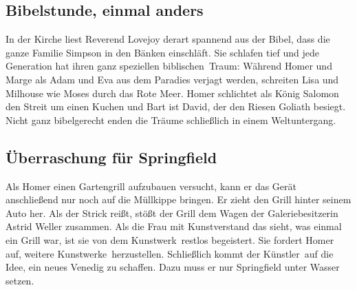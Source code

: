 \subsection{Bibelstunde, einmal anders}\label{AABF14}
In der Kirche liest Reverend Lovejoy derart spannend aus der Bibel, dass die ganze Familie Simpson in den Bänken einschläft. Sie schlafen tief und jede Generation hat ihren ganz speziellen \glqq biblischen\grqq\ Traum: Während Homer und Marge als Adam und Eva aus dem Paradies verjagt werden, schreiten Lisa und Milhouse wie Moses durch das Rote Meer. Homer schlichtet als König Salomon den Streit um einen Kuchen und Bart ist David, der den Riesen Goliath besiegt. Nicht ganz bibelgerecht enden die Träume schließlich in einem Weltuntergang.

	
\subsection{Überraschung für Springfield}
Als Homer einen Gartengrill aufzubauen versucht, kann er das Gerät anschließend nur noch auf die Müllkippe bringen. Er zieht den Grill hinter seinem Auto her. Als der Strick reißt, stößt der Grill dem Wagen der Galeriebesitzerin Astrid Weller zusammen. Als die Frau mit Kunstverstand das sieht, was einmal ein Grill war, ist sie von dem \glqq Kunstwerk\grqq\ restlos begeistert. Sie fordert Homer auf, weitere \glqq Kunstwerke\grqq\ herzustellen. Schließlich kommt der \glqq Künstler\grqq\ auf die Idee, ein neues Venedig zu schaffen. Dazu muss er nur Springfield unter Wasser setzen.

